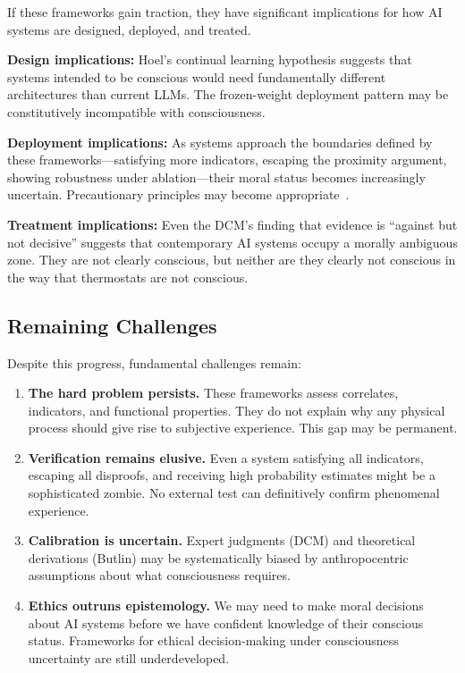 If these frameworks gain traction, they have significant implications for how AI systems are designed, deployed, and treated.

\textbf{Design implications:} Hoel's continual learning hypothesis suggests that systems intended to be conscious would need fundamentally different architectures than current LLMs. The frozen-weight deployment pattern may be constitutively incompatible with consciousness.

\textbf{Deployment implications:} As systems approach the boundaries defined by these frameworks---satisfying more indicators, escaping the proximity argument, showing robustness under ablation---their moral status becomes increasingly uncertain. Precautionary principles may become appropriate~\citep{birch2024precautionary}.

\textbf{Treatment implications:} Even the DCM's finding that evidence is ``against but not decisive'' suggests that contemporary AI systems occupy a morally ambiguous zone. They are not clearly conscious, but neither are they clearly not conscious in the way that thermostats are not conscious.

\subsection{Remaining Challenges}

Despite this progress, fundamental challenges remain:

\begin{enumerate}
    \item \textbf{The hard problem persists.} These frameworks assess correlates, indicators, and functional properties. They do not explain why any physical process should give rise to subjective experience. This gap may be permanent.

    \item \textbf{Verification remains elusive.} Even a system satisfying all indicators, escaping all disproofs, and receiving high probability estimates might be a sophisticated zombie. No external test can definitively confirm phenomenal experience.

    \item \textbf{Calibration is uncertain.} Expert judgments (DCM) and theoretical derivations (Butlin) may be systematically biased by anthropocentric assumptions about what consciousness requires.

    \item \textbf{Ethics outruns epistemology.} We may need to make moral decisions about AI systems before we have confident knowledge of their conscious status. Frameworks for ethical decision-making under consciousness uncertainty are still underdeveloped.
\end{enumerate}

